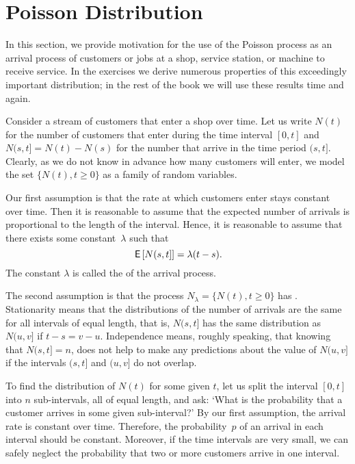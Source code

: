 \section{Poisson Distribution}
\label{sec:poisson-distribution}


In this section, we provide motivation for the use of the Poisson process as an arrival process of customers or jobs at a shop, service station, or machine to receive service. In the exercises we derive numerous properties of this exceedingly important distribution; in the rest of the book we will use these results time and again.

Consider a stream of customers that enter a shop over time.
Let us write $N(t)$ for the number of customers that enter during the time interval $[0,t]$ and $N(s, t] = N(t)-N(s)$ for the number that arrive in the time period $(s, t]$.
Clearly, as we do not know in advance how many customers will enter, we model the set $\{N(t), t\geq 0\}$ as a family of random variables.

Our first assumption is that the rate at which customers enter stays constant over time. Then it is reasonable to assume that
the expected number of arrivals is proportional to the length of
the interval. Hence, it is reasonable to assume that there exists some
constant~$\lambda$ such that
\begin{equation}
 \label{eq:6}
 \,\mathsf{E}\left[N(s,t]\right] = \lambda (t-s).
\end{equation}
The constant $\lambda$ is called the  of the arrival process.


The second assumption is that the process $N_\lambda = \{N(t), t\geq 0\}$ has .
Stationarity means that the distributions of the number of arrivals are the same for all intervals of equal length, that is, 
$N(s,t]$ has the same distribution as $N(u, v]$ if $t-s = v-u$.
Independence means, roughly speaking, that knowing that $N(s,t]= n$, does not help to make any predictions about the value of $N(u, v]$ if the intervals $(s,t]$ and $(u, v]$ do not overlap.



To find the distribution of $N(t)$ for some given $t$, let us split the interval $[0,t]$ into $n$ sub-intervals, all of equal length, and ask: `What is the probability that a customer arrives in some given sub-interval?'
By our first assumption, the arrival rate is constant over time.
Therefore, the probability~$p$ of an arrival in each interval should be constant.
Moreover, if the time intervals are very small, we can safely neglect the probability that two or more customers arrive in one interval.

